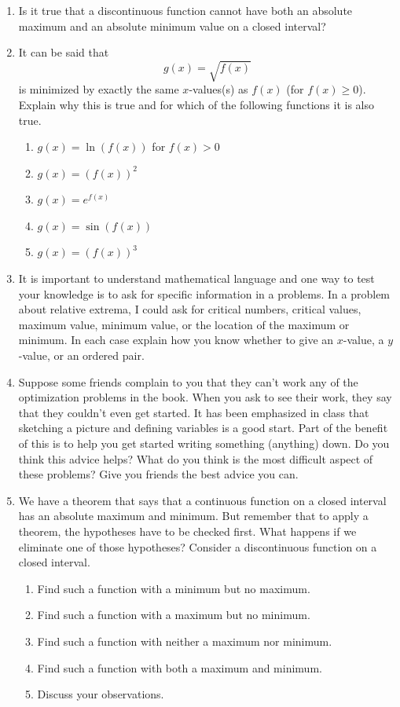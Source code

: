 \begin{enumerate}
\item  Is it true that a discontinuous function cannot have both an absolute maximum and an absolute minimum value on a closed interval?  \cite{FWG}

\item  It can be said that $$g(x) = \sqrt {f(x)} $$ is minimized by exactly the same $x$-values(s) as $f(x)$ (for $f(x) \ge 0$).  Explain why this is true and for which of the following functions it is also true.
\begin{enumerate} 
	\item $g(x) = \ln \left( {f(x)} \right)$ for $f(x) > 0$	
	\item $g(x) = \left( {f(x)} \right)^2 $	
	\item $g(x) = e^{f(x)} $
	\item $g(x) = \sin \left( {f(x)} \right)$
	\item $g(x) = \left( {f(x)} \right)^3 $
\end{enumerate}

\item  It is important to understand mathematical language and one way to test your knowledge is to ask for specific information in a problems.  In a problem about relative extrema, I could ask for critical numbers, critical values, maximum value, minimum value, or the location of the maximum or minimum.  In each case explain how you know whether to give an $x$-value, a $y$-value, or an ordered pair.

\item  Suppose some friends complain to you that they can't work any of the optimization problems in the book.   When you ask to see their work, they say that they couldn't even get started.  It has been emphasized in class that sketching a picture and defining variables is a good start.  Part of the benefit of this is to help you get started writing something (anything) down.  Do you think this advice helps?  What do you think is the most difficult aspect of these problems?  Give you friends the best advice you can.  \cite{SM}

\item  We have a theorem that says that a continuous function on a closed interval has an absolute maximum and minimum.  But remember that to apply a theorem, the hypotheses have to be checked first.  What happens if we eliminate one of those hypotheses?  Consider a discontinuous function on a closed interval.
\begin{enumerate}
	\item Find such a function with a minimum but no maximum.
	\item Find such a function with a maximum but no minimum.
	\item Find such a function with neither a maximum nor minimum.
	\item Find such a function with both a maximum and minimum.  \cite{SBS}
	\item Discuss your observations.
\end{enumerate}


\end{enumerate}
